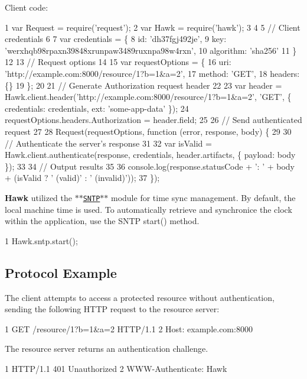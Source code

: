 Client code\+:


\begin{DoxyCode}
1 var Request = require('request');
2 var Hawk = require('hawk');
3 
4 
5 // Client credentials
6 
7 var credentials = \{
8     id: 'dh37fgj492je',
9     key: 'werxhqb98rpaxn39848xrunpaw3489ruxnpa98w4rxn',
10     algorithm: 'sha256'
11 \}
12 
13 // Request options
14 
15 var requestOptions = \{
16     uri: 'http://example.com:8000/resource/1?b=1&a=2',
17     method: 'GET',
18     headers: \{\}
19 \};
20 
21 // Generate Authorization request header
22 
23 var header = Hawk.client.header('http://example.com:8000/resource/1?b=1&a=2', 'GET', \{ credentials:
       credentials, ext: 'some-app-data' \});
24 requestOptions.headers.Authorization = header.field;
25 
26 // Send authenticated request
27 
28 Request(requestOptions, function (error, response, body) \{
29 
30     // Authenticate the server's response
31 
32     var isValid = Hawk.client.authenticate(response, credentials, header.artifacts, \{ payload: body \});
33 
34     // Output results
35 
36     console.log(response.statusCode + ': ' + body + (isValid ? ' (valid)' : ' (invalid)'));
37 \});
\end{DoxyCode}


{\bfseries Hawk} utilized the \href{https://github.com/hueniverse/sntp}{\tt $\ast$$\ast$\+S\+N\+T\+P$\ast$$\ast$} module for time sync management. By default, the local machine time is used. To automatically retrieve and synchronice the clock within the application, use the S\+N\+T\+P \textquotesingle{}start()\textquotesingle{} method.


\begin{DoxyCode}
1 Hawk.sntp.start();
\end{DoxyCode}


\subsection*{Protocol Example}

The client attempts to access a protected resource without authentication, sending the following H\+T\+T\+P request to the resource server\+:


\begin{DoxyCode}
1 GET /resource/1?b=1&a=2 HTTP/1.1
2 Host: example.com:8000
\end{DoxyCode}


The resource server returns an authentication challenge.


\begin{DoxyCode}
1 HTTP/1.1 401 Unauthorized
2 WWW-Authenticate: Hawk
\end{DoxyCode}


